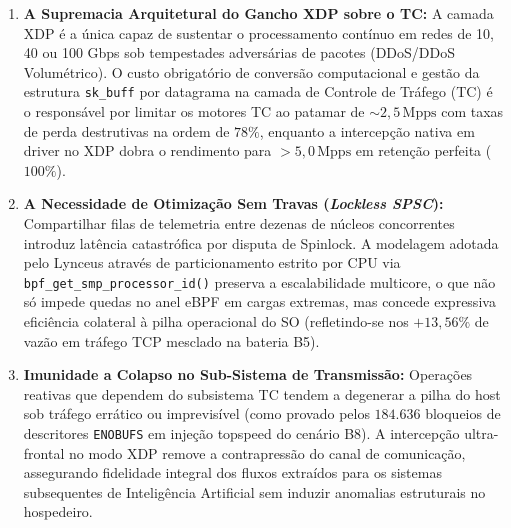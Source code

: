 \documentclass[11pt,a4paper]{article}
\begin{document}
\begin{enumerate}
    \item \textbf{A Supremacia Arquitetural do Gancho XDP sobre o TC:} A camada XDP é a única capaz de sustentar o processamento contínuo em redes de 10, 40 ou 100 Gbps sob tempestades adversárias de pacotes (DDoS/DDoS Volumétrico). O custo obrigatório de conversão computacional e gestão da estrutura \texttt{sk\_buff} por datagrama na camada de Controle de Tráfego (TC) é o responsável por limitar os motores TC ao patamar de $\sim 2,5\,\text{Mpps}$ com taxas de perda destrutivas na ordem de $78\%$, enquanto a intercepção nativa em driver no XDP dobra o rendimento para $>5,0\,\text{Mpps}$ em retenção perfeita ($100\%$).
    \item \textbf{A Necessidade de Otimização Sem Travas (\textit{Lockless SPSC}):} Compartilhar filas de telemetria entre dezenas de núcleos concorrentes introduz latência catastrófica por disputa de Spinlock. A modelagem adotada pelo Lynceus através de particionamento estrito por CPU via \texttt{bpf\_get\_smp\_processor\_id()} preserva a escalabilidade multicore, o que não só impede quedas no anel eBPF em cargas extremas, mas concede expressiva eficiência colateral à pilha operacional do SO (refletindo-se nos $+13,56\%$ de vazão em tráfego TCP mesclado na bateria B5).
    \item \textbf{Imunidade a Colapso no Sub-Sistema de Transmissão:} Operações reativas que dependem do subsistema TC tendem a degenerar a pilha do host sob tráfego errático ou imprevisível (como provado pelos $184.636$ bloqueios de descritores \texttt{ENOBUFS} em injeção topspeed do cenário B8). A intercepção ultra-frontal no modo XDP remove a contrapressão do canal de comunicação, assegurando fidelidade integral dos fluxos extraídos para os sistemas subsequentes de Inteligência Artificial sem induzir anomalias estruturais no hospedeiro.
\end{enumerate}
\end{document}
